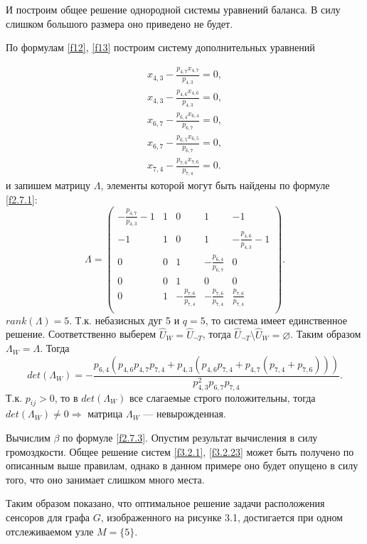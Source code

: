 \documentclass[14pt]{extarticle}%
\begin{document}
И построим общее решение однородной системы уравнений баланса. В силу слишком большого размера оно приведено не будет.

По формулам \eqref{f12}, \eqref{f13} построим систему дополнительных уравнений

\begin{equation}\label{f3.3.23}
\begin{gathered}
x_{4,3}-\frac{p_{4,7} x_{4,7}}{p_{4,3}}=0,\\
x_{4,3}-\frac{p_{4,6} x_{4,6}}{p_{4,3}}=0,\\
x_{6,7}-\frac{p_{6,4} x_{6,4}}{p_{6,7}}=0,\\
x_{6,7}-\frac{p_{6,5} x_{6,5}}{p_{6,7}}=0,\\
x_{7,4}-\frac{p_{7,6} x_{7,6}}{p_{7,4}}=0.
\end{gathered}
\end{equation}
и запишем матрицу $\Lambda$, элементы которой могут быть найдены по формуле \eqref{f2.7.1}:
$$
\Lambda=
\left(
\begin{array}{ccccc}
 -\frac{p_{4,7}}{p_{4,3}}-1 & 1 & 0 & 1 & -1 \\
 -1 & 1 & 0 & 1 & -\frac{p_{4,6}}{p_{4,3}}-1 \\
 0 & 0 & 1 & -\frac{p_{6,4}}{p_{6,7}} & 0 \\
 0 & 0 & 1 & 0 & 0 \\
 0 & 1 & -\frac{p_{7,6}}{p_{7,4}} & -\frac{p_{7,6}}{p_{7,4}} & \frac{p_{7,6}}{p_{7,4}} \\
\end{array}
\right).
$$
$rank(\Lambda)=5$. Т.к. небазисных дуг 5 и $q=5$, то система имеет единственное решение. Соответственно выберем $\widehat{U}_W=\widehat{U}_{\neg T}$, тогда $\widehat{U}_{\neg T}\setminus\widehat{U}_W=\varnothing$. Таким образом $\Lambda_W=\Lambda$.
Тогда 
$$
det(\Lambda_W)=-\frac{p_{6,4} \left(p_{4,6} p_{4,7} p_{7,4}+p_{4,3} \left(p_{4,6} p_{7,4}+p_{4,7} \left(p_{7,4}+p_{7,6}\right)\right)\right)}{p_{4,3}^2 p_{6,7} p_{7,4}}.
$$
Т.к. $p_{ij}>0$, то в $det(\Lambda_W)$ все слагаемые строго положительны, тогда $det(\Lambda_W)\neq 0 \Rightarrow$ матрица $\Lambda_W$ --- невырожденная. 

Вычислим $\beta$ по формуле \eqref{f2.7.3}. Опустим результат вычисления в силу громоздкости.
Общее решение систем \eqref{f3.2.1}, \eqref{f3.2.23} может быть получено по описанным выше правилам, однако в данном примере оно будет опущено в силу того, что оно занимает слишком много места.

Таким образом показано, что оптимальное решение задачи расположения сенсоров для графа $G$, изображенного на рисунке 3.1, достигается при одном отслеживаемом узле $M=\{5\}$.
\end{document}
